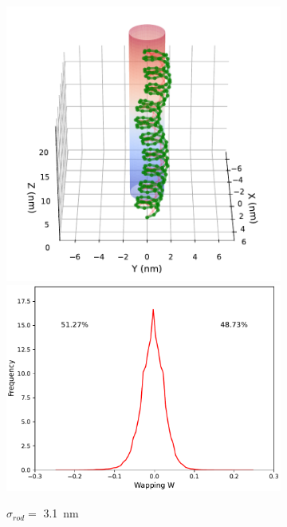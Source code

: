 \documentclass[a4paper,10pt]{article}
\begin{document}
\begin{figure}[tb]
\begin{subfigure}{.3\textwidth}
\includegraphics[width=\textwidth]{r1_B_2000000_17.pdf}
\includegraphics[width=\textwidth]{r1_B_wr_pr.pdf}
\caption{$\sigma_{rod}=$ \SI{3.1}{\nm}}
\label{fig:r1_b}
\end{subfigure}
\begin{subfigure}{.3\textwidth}

\end{subfigure}
\end{figure}
\end{document}
